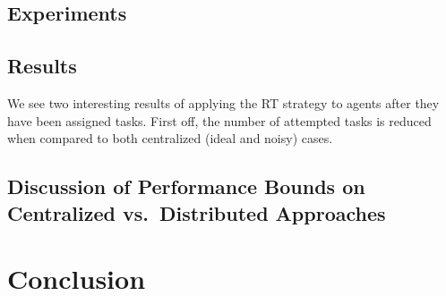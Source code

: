 \documentclass[defaultstyle,12pt]{thesis}
\begin{document}
\section{Experiments}


\section{Results}
We see two interesting results of applying the RT strategy to agents after they have been assigned tasks. First off, the number of attempted tasks is reduced when compared to both centralized (ideal and noisy) cases. 



\section{Discussion of Performance Bounds on Centralized vs.~Distributed Approaches}\label{ref:disc}


\chapter{Conclusion}



\end{document}
